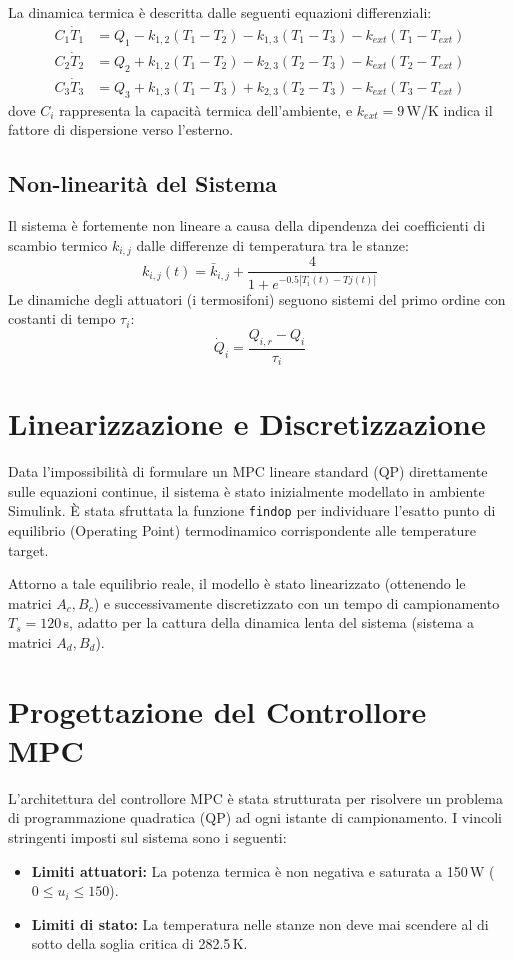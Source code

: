 \documentclass[12pt,a4paper]{article}
\begin{document}
La dinamica termica \`e descritta dalle seguenti equazioni differenziali:
\begin{align}
    C_1 \dot{T}_1 &= Q_1 - k_{1,2}(T_1 - T_2) - k_{1,3}(T_1 - T_3) - k_{ext}(T_1 - T_{ext}) \\
    C_2 \dot{T}_2 &= Q_2 + k_{1,2}(T_1 - T_2) - k_{2,3}(T_2 - T_3) - k_{ext}(T_2 - T_{ext}) \\
    C_3 \dot{T}_3 &= Q_3 + k_{1,3}(T_1 - T_3) + k_{2,3}(T_2 - T_3) - k_{ext}(T_3 - T_{ext})
\end{align}
dove $C_i$ rappresenta la capacit\`a termica dell'ambiente, e $k_{ext} = 9$\,W/K indica il fattore di dispersione verso l'esterno.

\subsection{Non-linearit\`a del Sistema}
Il sistema \`e fortemente non lineare a causa della dipendenza dei coefficienti di scambio termico $k_{i,j}$ dalle differenze di temperatura tra le stanze:
\begin{equation}
    k_{i,j}(t) = \bar{k}_{i,j} + \frac{4}{1 + e^{-0.5 |T_i(t) - Tj(t)|}}
\end{equation}
Le dinamiche degli attuatori (i termosifoni) seguono sistemi del primo ordine con costanti di tempo $\tau_i$:
\begin{equation}
    \dot{Q}_i = \frac{Q_{i,r} - Q_i}{\tau_i}
\end{equation}

\section{Linearizzazione e Discretizzazione}
Data l'impossibilit\`a di formulare un MPC lineare standard (QP) direttamente sulle equazioni continue, il sistema \`e stato inizialmente modellato in ambiente Simulink. \`E stata sfruttata la funzione \texttt{findop} per individuare l'esatto punto di equilibrio (Operating Point) termodinamico corrispondente alle temperature target. 

Attorno a tale equilibrio reale, il modello \`e stato linearizzato (ottenendo le matrici $A_c, B_c$) e successivamente discretizzato con un tempo di campionamento $T_s = 120$\,s, adatto per la cattura della dinamica lenta del sistema (sistema a matrici $A_d, B_d$).

\section{Progettazione del Controllore MPC}
L'architettura del controllore MPC \`e stata strutturata per risolvere un problema di programmazione quadratica (QP) ad ogni istante di campionamento. I vincoli stringenti imposti sul sistema sono i seguenti:
\begin{itemize}
    \item \textbf{Limiti attuatori:} La potenza termica \`e non negativa e saturata a 150\,W ($0 \le u_i \le 150$).
    \item \textbf{Limiti di stato:} La temperatura nelle stanze non deve mai scendere al di sotto della soglia critica di 282.5\,K.
\end{itemize}
\end{document}

